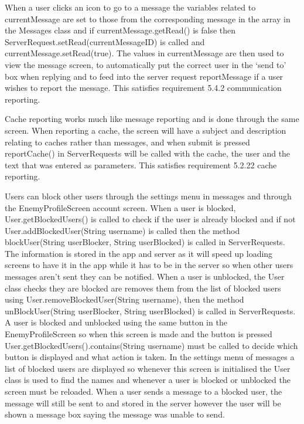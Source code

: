 When a user clicks an icon to go to a message the variables related to currentMessage are set to those from the corresponding message in the array in the Messages class and if currentMessage.getRead() is false then ServerRequest.setRead(currentMessageID) is called and currentMessage.setRead(true). The values in currentMessage are then used to view the message screen, to automatically put the correct user in the `send to' box when replying and to feed into the server request reportMessage if a user wishes to report the message. This satisfies requirement 5.4.2 communication reporting.

Cache reporting works much like message reporting and is done through the same screen. When reporting a cache, the screen will have a subject and description relating to caches rather than messages, and when submit is pressed reportCache() in ServerRequests will be called with the cache, the user and the text that was entered as parameters. This satisfies requirement 5.2.22 cache reporting.

Users can block other users through the settings menu in messages and through the EnemyProfileScreen account screen. When a user is blocked, User.getBlockedUsers() is called to check if the user is already blocked and if not User.addBlockedUser(String username) is called then the method blockUser(String userBlocker, String userBlocked) is called in ServerRequests. The information is stored in the app and server as it will speed up loading screens to have it in the app while it has to be in the server so when other users messages aren't sent they can be notified. When a user is unblocked, the User class checks they are blocked are removes them from the list of blocked users using User.removeBlockedUser(String username), then the method unBlockUser(String userBlocker, String userBlocked) is called in ServerRequests. A user is blocked and unblocked using the same button in the EnemyProfileScreen so when this screen is made and the button is pressed User.getBlockedUsers().contains(String username) must be called to decide which button is displayed and what action is taken. In the settings menu of messages a list of blocked users are displayed so whenever this screen is initialised the User class is used to find the names and whenever a user is blocked or unblocked the screen must be reloaded. When a user sends a message to a blocked user, the message will still be sent to and stored in the server however the user will be shown a message box saying the message was unable to send.

